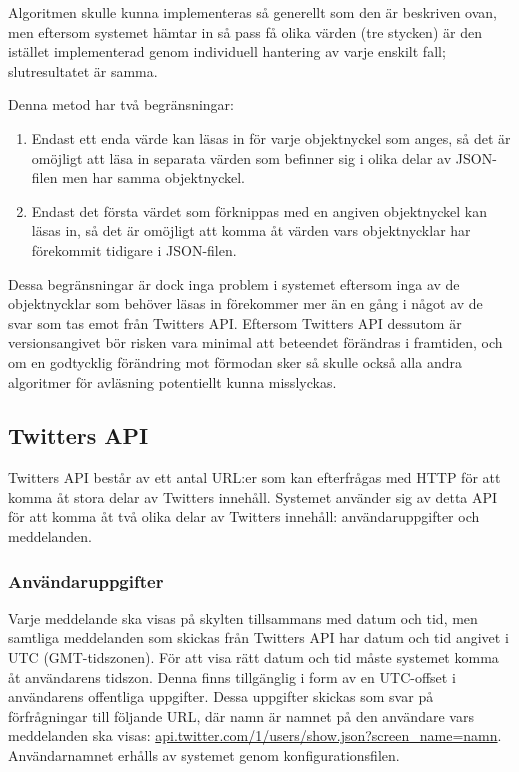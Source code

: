 \documentclass[a4paper,11pt]{article}
\begin{document}
Algoritmen skulle kunna implementeras så generellt som den är beskriven ovan, men eftersom systemet hämtar in så pass få olika värden (tre stycken) är den istället implementerad genom individuell hantering av varje enskilt fall; slutresultatet är samma.

Denna metod har två begränsningar:

	\begin{enumerate}
    	\item Endast ett enda värde kan läsas in för varje objektnyckel som anges, så det är omöjligt att läsa in separata värden som befinner sig i olika delar av JSON-filen men har samma objektnyckel.
    	\item Endast det första värdet som förknippas med en angiven objektnyckel kan läsas in, så det är omöjligt att komma åt värden vars objektnycklar har förekommit tidigare i JSON-filen.
	\end{enumerate}

Dessa begränsningar är dock inga problem i systemet eftersom inga av de objektnycklar som behöver läsas in förekommer mer än en gång i något av de svar som tas emot från Twitters API. Eftersom Twitters API dessutom är versionsangivet bör risken vara minimal att beteendet förändras i framtiden, och om en godtycklig förändring mot förmodan sker så skulle också alla andra algoritmer för avläsning potentiellt kunna misslyckas.

\subsection{Twitters API}
Twitters API består av ett antal URL:er som kan efterfrågas med HTTP för att komma åt stora delar av Twitters innehåll. Systemet använder sig av detta API för att komma åt två olika delar av Twitters innehåll: användaruppgifter och meddelanden. \\

\subsubsection{Användaruppgifter}

Varje meddelande ska visas på skylten tillsammans med datum och tid, men samtliga meddelanden som skickas från Twitters API har datum och tid angivet i UTC (GMT-tidszonen). För att visa rätt datum och tid måste systemet komma åt användarens tidszon. Denna finns tillgänglig i form av en UTC-offset i användarens offentliga uppgifter. Dessa uppgifter skickas som svar på förfrågningar till följande URL, där namn är namnet på den användare vars meddelanden ska visas: \url{api.twitter.com/1/users/show.json?screen_name=namn}. Användarnamnet erhålls av systemet genom konfigurationsfilen.
\end{document}
